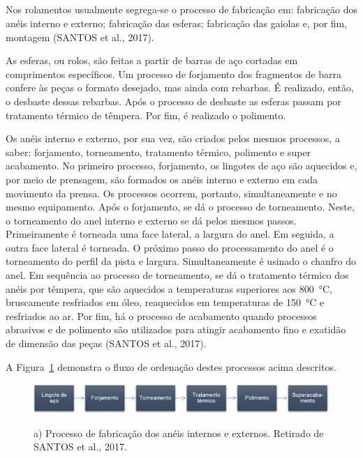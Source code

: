 \documentclass[
	12pt,				
	oneside,			
	a4paper,			
	english,			
	brazil,			
	]{abntex2ppgsi}
\begin{document}
\subsection{}

Nos rolamentos usualmente segrega-se o processo de fabricação em: fabricação dos anéis interno e externo; fabricação das esferas; fabricação das gaiolas e, por fim, montagem (SANTOS et al., 2017).   

As esferas, ou rolos, são feitas a partir de barras de aço cortadas em comprimentos específicos. Um processo de forjamento dos fragmentos de barra confere às peças o formato desejado, mas ainda com rebarbas. É realizado, então, o desbaste dessas rebarbas. Após o processo de desbaste as esferas passam por tratamento térmico de têmpera. Por fim, é realizado o polimento. 

Os anéis interno e externo, por sua vez, são criados pelos mesmos processos, a saber: forjamento, torneamento, tratamento térmico, polimento e super acabamento. No primeiro processo, forjamento, os lingotes de aço são aquecidos e, por meio de prensagem, são formados os anéis interno e externo em cada movimento da prensa. Os processos ocorrem, portanto, simultaneamente e no mesmo equipamento. Após o forjamento, se dá o processo de torneamento. Neste, o torneamento do anel interno e externo se dá pelos mesmos passos. Primeiramente é torneada uma face lateral, a largura do anel. Em seguida, a outra face lateral é torneada. O próximo passo do processamento do anel é o torneamento do perfil da pista e largura. Simultaneamente é usinado o chanfro do anel. Em sequência ao processo de torneamento, se dá o tratamento térmico dos anéis por têmpera, que são aquecidos a temperaturas superiores aos \SI{800}{\celsius}, bruscamente resfriados em óleo, reaquecidos em temperaturas de \SI{150}{\celsius} e resfriados ao ar. Por fim, há o processo de acabamento quando processos abrasivos e de polimento são utilizados para atingir acabamento fino e exatidão de dimensão das peças (SANTOS et al., 2017). 


A Figura~\ref{FiguraProcessoFabricacao} demonstra o fluxo de ordenação destes processos acima descritos.
\begin{figure}[!htb]
\centering
\caption{a) Processo de fabricação dos anéis internos e externos. Retirado de SANTOS et al., 2017.}
\includegraphics[width=\textwidth,height=\textheight,keepaspectratio]{Figura2}
\label{FiguraProcessoFabricacao}
\end{figure}
\end{document}
